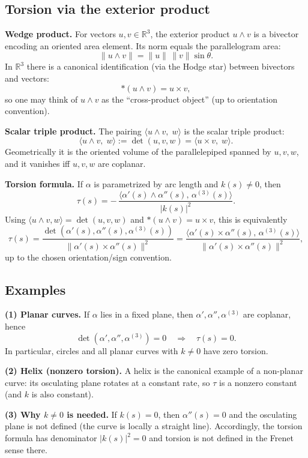 \documentclass[12pt,a4paper]{article}
\theoremstyle{plain}
\theoremstyle{definition}      %
\begin{document}
	\subsection*{Torsion via the exterior product}
	
	\noindent\textbf{Wedge product.}
	For vectors $u,v\in\mathbb{R}^3$, the exterior product $u\wedge v$ is a bivector encoding an oriented area element.
	Its norm equals the parallelogram area:
	\[
	\|u\wedge v\|=\|u\|\,\|v\|\sin\theta.
	\]
	In $\mathbb{R}^3$ there is a canonical identification (via the Hodge star) between bivectors and vectors:
	\[
	*(u\wedge v)=u\times v,
	\]
	so one may think of $u\wedge v$ as the ``cross-product object'' (up to orientation convention).
	
	\medskip
	\noindent\textbf{Scalar triple product.}
	The pairing $\langle u\wedge v,\;w\rangle$ is the scalar triple product:
	\[
	\langle u\wedge v,\;w\rangle := \det(u,v,w)=\langle u\times v,\;w\rangle.
	\]
	Geometrically it is the oriented volume of the parallelepiped spanned by $u,v,w$, and it vanishes iff $u,v,w$
	are coplanar.
	
	\medskip
	\noindent\textbf{Torsion formula.}
	If $\alpha$ is parametrized by arc length and $k(s)\neq 0$, then
	\[
	\tau(s)= -\,\frac{\big\langle \alpha'(s)\wedge \alpha''(s),\,\alpha^{(3)}(s)\big\rangle}{|k(s)|^2}.
	\]
	Using $\langle u\wedge v,w\rangle=\det(u,v,w)$ and $*(u\wedge v)=u\times v$, this is equivalently
	\[
	\tau(s)=\frac{\det(\alpha'(s),\alpha''(s),\alpha^{(3)}(s))}{\|\alpha'(s)\times\alpha''(s)\|^2}
	=\frac{\langle \alpha'(s)\times\alpha''(s),\,\alpha^{(3)}(s)\rangle}{\|\alpha'(s)\times\alpha''(s)\|^2},
	\]
	up to the chosen orientation/sign convention.
	
	\subsection*{Examples}
	
	\noindent\textbf{(1) Planar curves.}
	If $\alpha$ lies in a fixed plane, then $\alpha',\alpha'',\alpha^{(3)}$ are coplanar, hence
	\[
	\det(\alpha',\alpha'',\alpha^{(3)})=0
	\quad\Rightarrow\quad
	\tau(s)=0.
	\]
	In particular, circles and all planar curves with $k\neq 0$ have zero torsion.
	
	\medskip
	\noindent\textbf{(2) Helix (nonzero torsion).}
	A helix is the canonical example of a non-planar curve: its osculating plane rotates at a constant rate, so
	$\tau$ is a nonzero constant (and $k$ is also constant).
	
	\medskip
	\noindent\textbf{(3) Why $k\neq 0$ is needed.}
	If $k(s)=0$, then $\alpha''(s)=0$ and the osculating plane is not defined (the curve is locally a straight line).
	Accordingly, the torsion formula has denominator $|k(s)|^2=0$ and torsion is not defined in the Frenet sense there.
	
\end{document}
